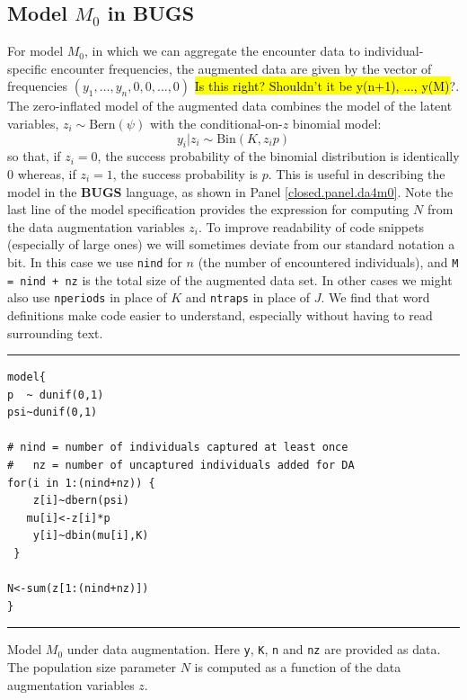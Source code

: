 \subsection{Model $M_0$ in BUGS}

For model $M_0$, in which we can aggregate the encounter data to
individual-specific encounter frequencies, the augmented data are
given by the vector of frequencies $(y_{1}, \ldots, y_{n}, 0, 0,
\ldots, 0)$ \hl{Is this right? Shouldn't it be y(n+1), ...,
  y(M)}?. The zero-inflated model of the augmented data combines
the model of the latent variables, $z_{i} \sim \mbox{Bern}(\psi)$ with
the conditional-on-$z$ binomial model:
\[
y_{i}|z_{i}   \sim \mbox{Bin}(K,z_{i} p)
\]
so that, if $z_{i}=0$, the success probability of the binomial
distribution is identically 0 whereas, if $z_{i}=1$, the success
probability is $p$. This is useful in describing the model in the {\bf
  BUGS} language, as shown in Panel \ref{closed.panel.da4m0}.
 Note the last line of the model
specification  provides the expression for computing $N$ from the
data augmentation variables $z_{i}$. To improve readability of code
snippets (especially of large ones) we will sometimes deviate from our
standard notation a bit. In this case we use \mbox{\tt nind} for $n$
(the number of encountered individuals), and \mbox{\tt M = nind + nz}
is the total size of the augmented data set. In other cases we might
also use \mbox{\tt nperiods} in place of $K$ and \mbox{\tt ntraps} in
place of $J$. We find that word definitions make code easier to
understand, especially without having to read surrounding text.

\begin{panel}[htp]
\centering
\rule[0.15in]{\textwidth}{.03in}
{\small
\begin{verbatim}
model{
p  ~ dunif(0,1)
psi~dunif(0,1)

# nind = number of individuals captured at least once
#   nz = number of uncaptured individuals added for DA
for(i in 1:(nind+nz)) {
    z[i]~dbern(psi)
   mu[i]<-z[i]*p
    y[i]~dbin(mu[i],K)
 }

N<-sum(z[1:(nind+nz)])
}
\end{verbatim}
}
\rule[-0.15in]{\textwidth}{.03in}
\caption{Model $M_{0}$ under data augmentation. Here \mbox{\tt y},
  \mbox{\tt K}, \mbox{\tt n} and \mbox{\tt nz} are provided as
  data. The population size parameter $N$ is computed as a function of
the data augmentation variables $z$. }
\label{closed.panel.da4m0}
\end{panel}

